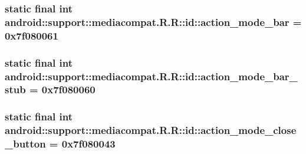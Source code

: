 \hypertarget{classandroid_1_1support_1_1mediacompat_1_1_r_1_1id_31bc3bf27def50e961fe550aac3b355a}{
\subsubsection[{action\_\-mode\_\-bar}]{\setlength{\rightskip}{0pt plus 5cm}static final int android::support::mediacompat.R.R::id::action\_\-mode\_\-bar = 0x7f080061}}
\label{classandroid_1_1support_1_1mediacompat_1_1_r_1_1id_31bc3bf27def50e961fe550aac3b355a}


\hypertarget{classandroid_1_1support_1_1mediacompat_1_1_r_1_1id_6617c0df00b6401c5b358560606f64f2}{
\subsubsection[{action\_\-mode\_\-bar\_\-stub}]{\setlength{\rightskip}{0pt plus 5cm}static final int android::support::mediacompat.R.R::id::action\_\-mode\_\-bar\_\-stub = 0x7f080060}}
\label{classandroid_1_1support_1_1mediacompat_1_1_r_1_1id_6617c0df00b6401c5b358560606f64f2}


\hypertarget{classandroid_1_1support_1_1mediacompat_1_1_r_1_1id_989d4ed605cbb8f2ce8a99be7a195bf9}{
\subsubsection[{action\_\-mode\_\-close\_\-button}]{\setlength{\rightskip}{0pt plus 5cm}static final int android::support::mediacompat.R.R::id::action\_\-mode\_\-close\_\-button = 0x7f080043}}
\label{classandroid_1_1support_1_1mediacompat_1_1_r_1_1id_989d4ed605cbb8f2ce8a99be7a195bf9}


